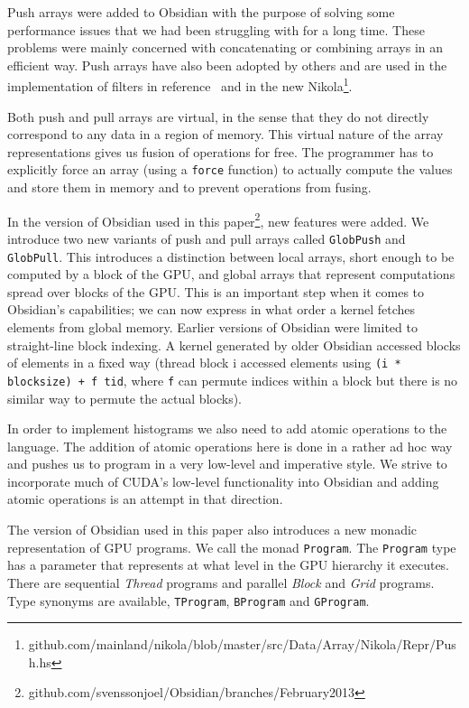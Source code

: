 Push arrays were added to Obsidian with the purpose of solving some performance 
issues that we had been struggling with for a long time. These problems were 
mainly concerned with concatenating or combining arrays in an efficient way.
Push arrays have also been adopted by others and are used in the implementation 
of filters in reference~\cite{FPCDSL} and in the new Nikola\footnote{github.com/mainland/nikola/blob/master/src/Data/Array/Nikola/Repr/Push.hs}.

Both push and pull arrays are virtual, in the sense that they do not directly 
correspond to any data in a region of memory. This virtual nature of the array 
representations gives us fusion of operations for free. The programmer has 
to explicitly force an array (using a {\tt force} function) to actually compute 
the values and store them in memory and to prevent operations from fusing. 

In the version of Obsidian used in this paper\footnote{github.com/svenssonjoel/Obsidian/branches/February2013}, new features were added.  We 
introduce two new variants of push and pull arrays called {\tt GlobPush} and 
{\tt GlobPull}. This introduces a distinction between local arrays, short 
enough to be computed by a block of the GPU, and global arrays that represent 
computations spread over blocks of the GPU. This is an important step when 
it comes to Obsidian's capabilities; we can now express in what order a kernel
fetches elements from global memory. 
Earlier versions of Obsidian were limited to straight-line block indexing. A kernel 
generated by older Obsidian accessed blocks of elements in a fixed way (thread block 
i accessed elements using {\tt (i * blocksize) + f tid}, where {\tt f} can permute 
indices within a block but there is no similar way to permute the actual blocks). 

In order to implement histograms we also need to add  atomic operations to the language. The addition of atomic operations here is 
done in a rather ad hoc way and pushes us to program in a very low-level and 
imperative style. We strive to incorporate much of CUDA's low-level functionality 
into Obsidian and adding atomic operations is an attempt in that 
direction.  

The version of Obsidian used in this paper also introduces a new monadic representation 
of GPU programs. We call the monad {\tt Program}. The {\tt Program} type has a 
parameter that represents at what level in the GPU hierarchy it executes. There 
are sequential {\em Thread} programs and parallel {\em Block} and {\em Grid} programs. Type synonyms 
are available, {\tt TProgram}, {\tt BProgram} and {\tt GProgram}.   

